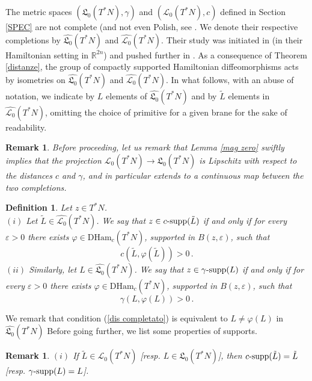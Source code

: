 \documentclass{article}
\newcommand{\1}{\mathbbm{1}}
\newcommand{\supp}{\text{supp}}
\newtheorem{defn}[thm]{Definition}
\newtheorem{rem}[thm]{Remark}
\theoremstyle{remark}
\begin{document}
{{\indent The metric spaces $(\mathfrak{L}_0(T^*N),\gamma)$ and $(\mathscr{L}_0(T^*N),c)$ defined in Section \ref{SPEC} are not complete (and not even Polish, see \cite[Proposition A.1.]{vit22}. We denote their respective completions by $\widehat{\mathfrak{L}_0}(T^*N)$ and $\widehat{\mathscr{L}_0}(T^*N)$. Their study was initiated in \cite{hum08} (in their Hamiltonian setting in $\mathbb{R}^{2n}$) and pushed further in \cite{vit22}. As a consequence of Theorem \ref{distanze}, the group of compactly supported Hamiltonian diffeomorphisms acts by isometries on $\widehat{\mathfrak{L}_0}(T^*N)$ and $\widehat{\mathscr{L}_0}(T^*N)$. 
\noindent In what follows, with an abuse of notation, we indicate by $L$ elements of $\widehat{\mathfrak{L}_0}(T^*N)$ and by $\tilde L$ elements in $\widehat{\mathscr{L}_0}(T^*N)$, omitting  the choice of primitive for a given brane for the sake of readability.
\begin{rem}
    \textnormal{Before proceeding, let us remark that Lemma \ref{mag zero} swiftly implies that the projection $\mathscr{L}_0(T^*N)\rightarrow\mathfrak{L}_0(T^*N)$ is Lipschitz with respect to the distances $c$ and $\gamma$, and in particular extends to a continuous map between the two completions.}  
\end{rem}
\begin{defn} Let $z\in T^*N$. \\
$(i)$ Let $\tilde{L} \in\widehat{\mathscr{L}_0}(T^*N)$. We say that $z\in c \textnormal{-supp}(\tilde{L})$ if and only if for every $\varepsilon>0$ there exists $\varphi\in\mathrm{DHam}_c(T^*N)$, supported in $B(z, \varepsilon)$, such that
    \begin{equation}
        c(\tilde{L}, \varphi (\tilde{L}))>0\, .
    \end{equation}
$(ii)$ Similarly, let $L \in \widehat{\mathfrak{L}_0}(T^*N)$. We say that $z \in \gamma\textnormal{-\supp}(L)$ if and only if for every $\varepsilon>0$ there exists $\varphi\in\mathrm{DHam}_c(T^*N)$, supported in $B(z, \varepsilon)$, such that
    \begin{equation} \label{dis completato}
        \gamma(L, \varphi (L))>0\, .
    \end{equation}
\end{defn}
\noindent We remark that condition (\ref{dis completato}) is equivalent to $L \neq \varphi(L)$ in $\widehat{\mathfrak{L}_0}(T^*N)$
\noindent Before going further, we list some properties of supports. 
\begin{rem} \label{3remarks} \textnormal{$(i)$ If $\tilde{L} \in \mathscr{L}_0(T^*N)$ [resp. $L \in \mathfrak{L}_0(T^*N)$], then $c\textnormal{-supp}(\tilde{L}) = \tilde{L}$ [resp. $\gamma\textnormal{-supp}(L) = L$]. \\
}
\end{rem}}}
\end{document}
